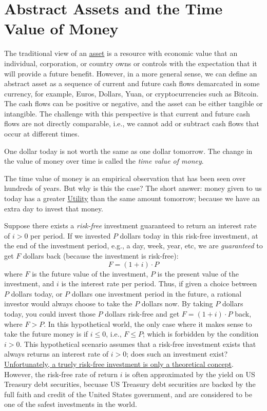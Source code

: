\documentclass[11pt]{article}
\theoremstyle{definition}
\newcommand{\newterm}[1]{{\it #1}}
\begin{document}
\section*{Abstract Assets and the Time Value of Money}
The traditional view of an \href{https://en.wikipedia.org/wiki/Asset}{asset} is a resource with economic value that an individual, corporation, or country owns or controls with the expectation that it will provide a future benefit.
However, in a more general sense, we can define an abstract asset as a sequence of current and future cash flows demarcated in some currency, for example, Euros, Dollars, Yuan, or cryptocurrencies such as Bitcoin.
The cash flows can be positive or negative, and the asset can be either tangible or intangible.
The challenge with this perspective is that current and future cash flows are not directly comparable,
i.e., we cannot add or subtract cash flows that occur at different times.

\begin{concept}\label{concept:time-value-of-money}
	One dollar today is not worth the same as one dollar tomorrow. 
	The change in the value of money over time is called the \newterm{time value of money}.
	\end{concept}
The time value of money is an empirical observation that has been seen over hundreds of years. 
But why is this the case? The short answer: money given to us today has a greater \href{https://en.wikipedia.org/wiki/Utility}{Utility} 
than the same amount tomorrow; because we have an extra day to invest that money.

Suppose there exists a \emph{risk-free} investment guaranteed to return an interest rate of $i>0$ per period.
If we invested $P$ dollars today in this risk-free investment, at the end of the investment period, e.g., a day, week, year, etc, 
we are \emph{guaranteed} to get $F$ dollars back (because the investment is risk-free):
\begin{equation}
F = (1+i)\cdot{P}
\end{equation}
where $F$ is the future value of the investment, $P$ is the present value of the investment, and $i$ is the interest rate per period.
Thus, if given a choice between $P$ dollars today, or $P$ dollars one investment period in the future, 
a rational investor would always choose to take the $P$ dollars now. By taking $P$ dollars today, you could invest those $P$ dollars risk-free and get $F = (1+i)\cdot{P}$ back, where $F>P$. 
In this hypothetical world, the only case where it makes sense to take the future money is if $i\leq{0}$, i.e., $F\leq{P}$; which is forbidden by the condition $i>0$. 
This hypothetical scenario assumes that a risk-free investment exists that always returns an interest rate of $i>0$; 
does such an investment exist? \href{https://www.investopedia.com/terms/r/risk-freerate.asp}{Unfortunately, a truely risk-free investment is only a theoretical concept}. 
However, the risk-free rate of return $i$ is often approximated by the yield on US Treasury debt securities, becuase US Treasury debt securities are backed by the full faith and credit of the United States government,
and are considered to be one of the safest investments in the world.
\end{document}
